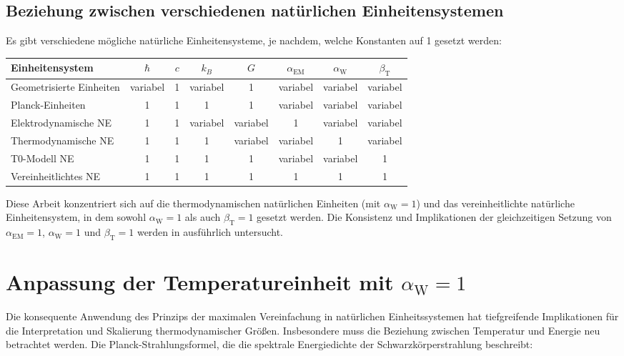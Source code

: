 \documentclass[12pt,a4paper]{article}
\newcommand{\alphaEM}{\alpha_{\text{EM}}}
\newcommand{\betaT}{\beta_{\text{T}}}
\newcommand{\alphaW}{\alpha_{\text{W}}}
\begin{document}
	\subsection{Beziehung zwischen verschiedenen natürlichen Einheitensystemen}
	
	Es gibt verschiedene mögliche natürliche Einheitensysteme, je nachdem, welche Konstanten auf 1 gesetzt werden:
	
	\begin{center}
		\begin{tabular}{|l|c|c|c|c|c|c|c|}
			\hline
			\textbf{Einheitensystem} & \(\hbar\) & \(c\) & \(k_B\) & \(G\) & \(\alphaEM\) & \(\alphaW\) & \(\betaT\) \\
			\hline
			Geometrisierte Einheiten & variabel & 1 & variabel & 1 & variabel & variabel & variabel \\
			Planck-Einheiten & 1 & 1 & 1 & 1 & variabel & variabel & variabel \\
			Elektrodynamische NE & 1 & 1 & variabel & variabel & 1 & variabel & variabel \\
			Thermodynamische NE & 1 & 1 & 1 & variabel & variabel & 1 & variabel \\
			T0-Modell NE & 1 & 1 & 1 & 1 & variabel & variabel & 1 \\
			Vereinheitlichtes NE & 1 & 1 & 1 & 1 & 1 & 1 & 1 \\
			\hline
		\end{tabular}
	\end{center}
	
	Diese Arbeit konzentriert sich auf die thermodynamischen natürlichen Einheiten (mit \(\alphaW = 1\)) und das vereinheitlichte natürliche Einheitensystem, in dem sowohl \(\alphaW = 1\) als auch \(\betaT = 1\) gesetzt werden. Die Konsistenz und Implikationen der gleichzeitigen Setzung von \(\alphaEM = 1\), \(\alphaW = 1\) und \(\betaT = 1\) werden in \cite{pascher_alphabeta_2025} ausführlich untersucht.
	
	\section{Anpassung der Temperatureinheit mit \(\alphaW = 1\)}
	
	Die konsequente Anwendung des Prinzips der maximalen Vereinfachung in natürlichen Einheitssystemen hat tiefgreifende Implikationen für die Interpretation und Skalierung thermodynamischer Größen. Insbesondere muss die Beziehung zwischen Temperatur und Energie neu betrachtet werden. Die Planck-Strahlungsformel, die die spektrale Energiedichte der Schwarzkörperstrahlung beschreibt:
	
\end{document}
